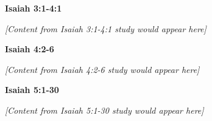 \documentclass[11pt]{article}
\begin{document}
\newpage

\begin{center}
{\Huge\bfseries Isaiah 3:1-4:1}
\end{center}
\vspace{10pt}


\vspace{2em}
\textit{[Content from Isaiah 3:1-4:1 study would appear here]}

\newpage

\begin{center}
{\Huge\bfseries Isaiah 4:2-6}
\end{center}
\vspace{10pt}


\vspace{2em}
\textit{[Content from Isaiah 4:2-6 study would appear here]}

\newpage

\begin{center}
{\Huge\bfseries Isaiah 5:1-30}
\end{center}
\vspace{10pt}


\vspace{2em}
\textit{[Content from Isaiah 5:1-30 study would appear here]}
\end{document}
